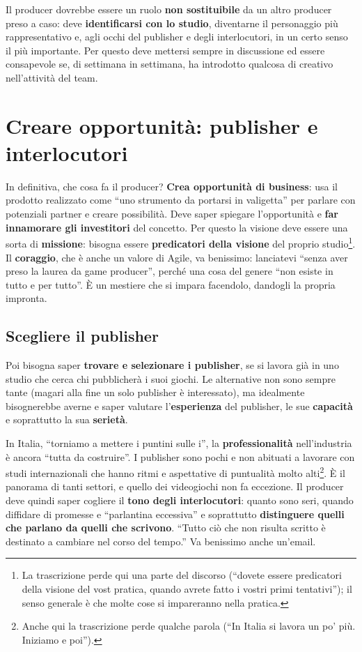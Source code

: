 Il producer dovrebbe essere un ruolo \textbf{non sostituibile} da un altro
producer preso a caso: deve \textbf{identificarsi con lo studio}, diventarne il
personaggio più rappresentativo e, agli occhi del publisher e degli
interlocutori, in un certo senso il più importante. Per questo deve mettersi
sempre in discussione ed essere consapevole se, di settimana in settimana, ha
introdotto qualcosa di creativo nell'attività del team.

\section{Creare opportunità: publisher e interlocutori}
\label{sec:z5-opportunita}

In definitiva, che cosa fa il producer? \textbf{Crea opportunità di business}:
usa il prodotto realizzato come ``uno strumento da portarsi in valigetta'' per
parlare con potenziali partner e creare possibilità. Deve saper spiegare
l'opportunità e \textbf{far innamorare gli investitori} del concetto. Per questo
la visione deve essere una sorta di \textbf{missione}: bisogna essere
\textbf{predicatori della visione} del proprio studio\footnote{La trascrizione
perde qui una parte del discorso (``dovete essere predicatori della visione del
vost pratica, quando avrete fatto i vostri primi tentativi''); il senso
generale è che molte cose si impareranno nella pratica.}. Il
\textbf{coraggio}, che è anche un valore di Agile, va benissimo: lanciatevi
``senza aver preso la laurea da game producer'', perché una cosa del genere
``non esiste in tutto e per tutto''. È un mestiere che si impara facendolo,
dandogli la propria impronta.

\subsection{Scegliere il publisher}

Poi bisogna saper \textbf{trovare e selezionare i publisher}, se si lavora già in
uno studio che cerca chi pubblicherà i suoi giochi. Le alternative non sono
sempre tante (magari alla fine un solo publisher è interessato), ma idealmente
bisognerebbe averne e saper valutare l'\textbf{esperienza} del publisher, le sue
\textbf{capacità} e soprattutto la sua \textbf{serietà}.

In Italia, ``torniamo a mettere i puntini sulle i'', la
\textbf{professionalità} nell'industria è ancora ``tutta da costruire''. I
publisher sono pochi e non abituati a lavorare con studi internazionali che
hanno ritmi e aspettative di puntualità molto alti\footnote{Anche qui la
trascrizione perde qualche parola (``In Italia si lavora un po' più. Iniziamo e
poi'').}. È il panorama di tanti settori, e quello dei videogiochi non fa
eccezione. Il producer deve quindi saper cogliere il \textbf{tono degli
interlocutori}: quanto sono seri, quando diffidare di promesse e ``parlantina
eccessiva'' e soprattutto \textbf{distinguere quelli che parlano da quelli che
scrivono}. ``Tutto ciò che non risulta scritto è destinato a cambiare nel corso
del tempo.'' Va benissimo anche un'email.

